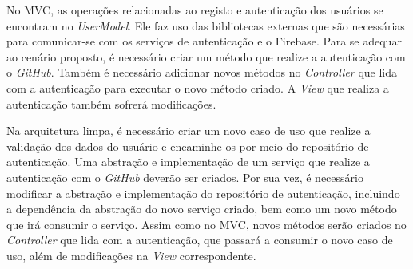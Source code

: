 No MVC, as operações relacionadas ao registo e autenticação dos usuários se encontram no \emph{UserModel}.
Ele faz uso das bibliotecas externas que são necessárias para comunicar-se com os serviços de autenticação e o Firebase.
Para se adequar ao cenário proposto, é necessário criar um método que realize a autenticação com o \emph{GitHub}.
Também é necessário adicionar novos métodos no \emph{Controller} que lida com a autenticação para executar o novo método criado.
A \emph{View} que realiza a autenticação também sofrerá modificações.

Na arquitetura limpa, é necessário criar um novo caso de uso que realize a validação dos dados do usuário e encaminhe-os por meio do repositório de autenticação.
Uma abstração e implementação de um serviço que realize a autenticação com o \emph{GitHub} deverão ser criados.
Por sua vez, é necessário modificar a abstração e implementação do repositório de autenticação, incluindo a dependência da abstração do novo serviço criado, bem como um novo método que irá consumir o serviço.
Assim como no MVC, novos métodos serão criados no \emph{Controller} que lida com a autenticação, que passará a consumir o novo caso de uso, além de modificações na \emph{View} correspondente.
